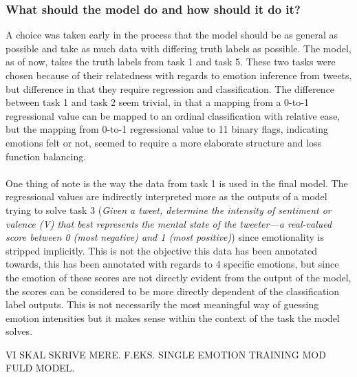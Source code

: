 \subsubsection{What should the model do and how should it do it?}
A choice was taken early in the process that the model should be as general as possible and take as much data with differing truth labels as possible. The model, as of now, takes the truth labels from task 1 and task 5. These two tasks were chosen because of their relatedness with regards to emotion inference from tweets, but difference in that they require regression and classification. The difference between task 1 and task 2 seem trivial, in that a mapping from a 0-to-1 regressional value can be mapped to an ordinal classification with relative ease, but the mapping from 0-to-1 regressional value to 11 binary flags, indicating emotions felt or not, seemed to require a more elaborate structure and loss function balancing.\\
\\
One thing of note is the way the data from task 1 is used in the final model. The regressional values are indirectly interpreted more as the outputs of a model trying to solve task 3 (\textit{Given a tweet, determine the intensity of sentiment or valence (V) that best represents the mental state of the tweeter—a real-valued score between 0 (most negative) and 1 (most positive)}) since emotionality is stripped implicitly. This is not the objective this data has been annotated towards, this has been annotated with regards to 4 specific emotions, but since the emotion of these scores are not directly evident from the output of the model, the scores can be considered to be more directly dependent of the classification label outputs. This is not necessarily the most meaningful way of guessing emotion intensities but it makes sense within the context of the task the model solves.

VI SKAL SKRIVE MERE. 	F.EKS. SINGLE EMOTION TRAINING MOD FULD MODEL.\\


